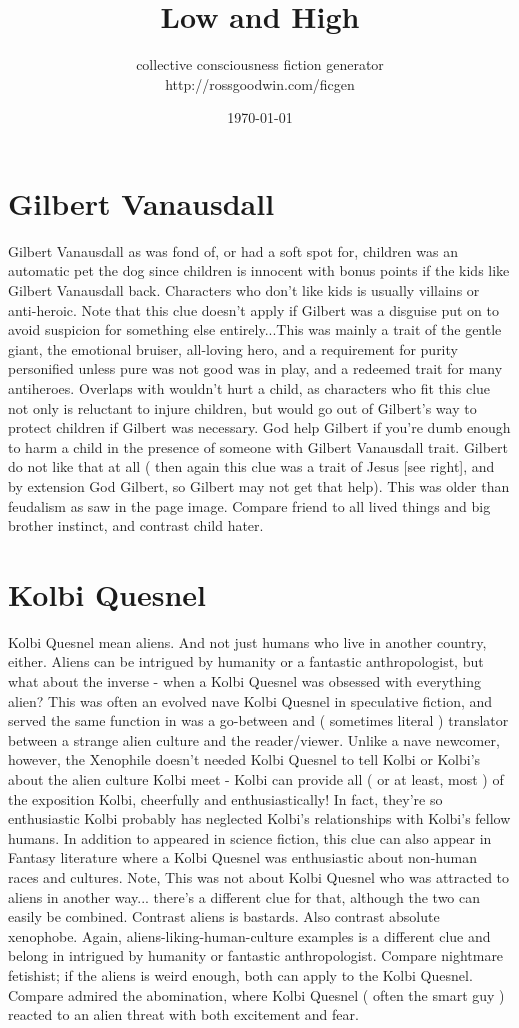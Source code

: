 \documentclass[12pt]{book}
\title{Low and High}
\author{collective consciousness fiction generator\\http://rossgoodwin.com/ficgen}
\date{\today}
\begin{document}
\maketitle


\chapter{Gilbert Vanausdall}
Gilbert Vanausdall as was fond of, or had a soft spot for, children was an automatic pet the dog since children is innocent with bonus points if the kids like Gilbert Vanausdall back. Characters who don't like kids is usually villains or anti-heroic. Note that this clue doesn't apply if Gilbert was a disguise put on to avoid suspicion for something else entirely...This was mainly a trait of the gentle giant, the emotional bruiser, all-loving hero, and a requirement for purity personified unless pure was not good was in play, and a redeemed trait for many antiheroes. Overlaps with wouldn't hurt a child, as characters who fit this clue not only is reluctant to injure children, but would go out of Gilbert's way to protect children if Gilbert was necessary. God help Gilbert if you're dumb enough to harm a child in the presence of someone with Gilbert Vanausdall trait. Gilbert do not like that at all ( then again this clue was a trait of Jesus [see right], and by extension God Gilbert, so Gilbert may not get that help). This was older than feudalism as saw in the page image. Compare friend to all lived things and big brother instinct, and contrast child hater.

\chapter{Kolbi Quesnel}
Kolbi Quesnel mean aliens. And not just humans who live in another country, either. Aliens can be intrigued by humanity or a fantastic anthropologist, but what about the inverse - when a Kolbi Quesnel was obsessed with everything alien? This was often an evolved nave Kolbi Quesnel in speculative fiction, and served the same function in was a go-between and ( sometimes literal ) translator between a strange alien culture and the reader/viewer. Unlike a nave newcomer, however, the Xenophile doesn't needed Kolbi Quesnel to tell Kolbi or Kolbi's about the alien culture Kolbi meet - Kolbi can provide all ( or at least, most ) of the exposition Kolbi, cheerfully and enthusiastically! In fact, they're so enthusiastic Kolbi probably has neglected Kolbi's relationships with Kolbi's fellow humans. In addition to appeared in science fiction, this clue can also appear in Fantasy literature where a Kolbi Quesnel was enthusiastic about non-human races and cultures. Note, This was not about Kolbi Quesnel who was attracted to aliens in another way... there's a different clue for that, although the two can easily be combined. Contrast aliens is bastards. Also contrast absolute xenophobe. Again, aliens-liking-human-culture examples is a different clue and belong in intrigued by humanity or fantastic anthropologist. Compare nightmare fetishist; if the aliens is weird enough, both can apply to the Kolbi Quesnel. Compare admired the abomination, where Kolbi Quesnel ( often the smart guy ) reacted to an alien threat with both excitement and fear.
\end{document}
